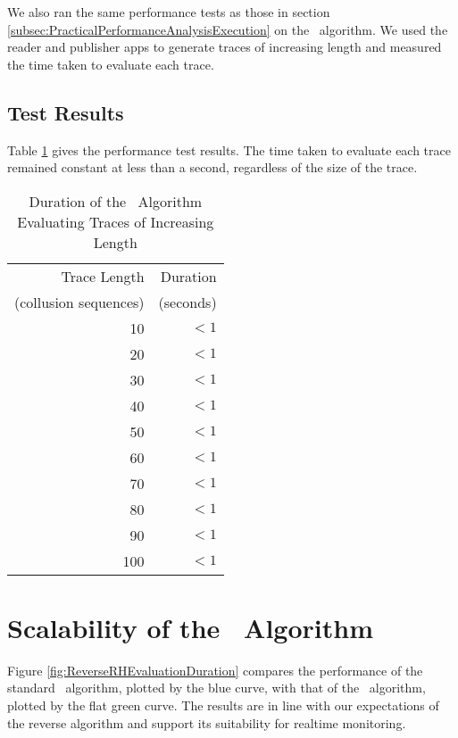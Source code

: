 We also ran the same performance tests as those in section \ref{subsec:PracticalPerformanceAnalysisExecution} on the \RRH\ algorithm.  We used the reader and publisher apps to generate traces of increasing length and measured the time taken to evaluate each trace.

\subsection{Test Results}
\label{subsec:PracticalPerformanceAnalysisResultsRRH}

Table \ref{tab:ReverseRHExecutionTimes} gives the performance test results.  The time taken to evaluate each trace remained constant at less than a second, regardless of the size of the trace.

\begin{table}[h!]
	\centering
	\captionsetup{width=0.6\linewidth, justification=centering}
	\begin{tabular}{r|r} 
	Trace Length  & Duration\\
	(collusion sequences) & (seconds)\\
	\hline
	10 & $<1$\\
	20 & $<1$\\
	30 & $<1$\\
	40 & $<1$\\
	50 & $<1$\\
	60 & $<1$\\
	70 & $<1$\\
	80 & $<1$\\
	90 & $<1$\\
	100 & $<1$\\
	\hline
	\end{tabular}
	\caption{Duration of the \RRH\ Algorithm Evaluating Traces of Increasing Length}
	\label{tab:ReverseRHExecutionTimes}
\end{table}


\section{Scalability of the \RRH\ Algorithm}
\label{sec:Scalability Of Reverse Rosu-Havelund Algorithm}

Figure \ref{fig:ReverseRHEvaluationDuration} compares the performance of the standard \RH\ algorithm, plotted by the blue curve, with that of the \RRH\ algorithm, plotted by the flat green curve.  The results are in line with our expectations of the reverse algorithm and support its suitability for realtime monitoring.

